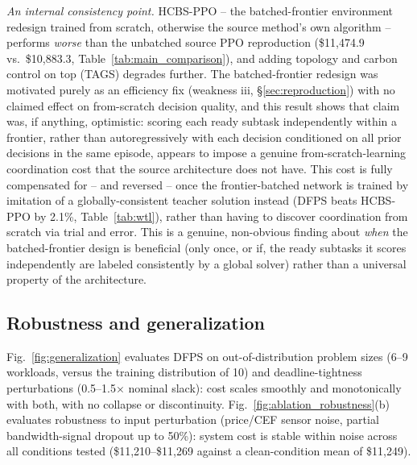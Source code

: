 \documentclass[journal]{IEEEtran}
\begin{document}
\textit{An internal consistency point.} HCBS-PPO -- the batched-frontier environment redesign trained from scratch, otherwise the source method's own algorithm -- performs \emph{worse} than the unbatched source PPO reproduction (\$11{,}474.9 vs.\ \$10{,}883.3, Table~\ref{tab:main_comparison}), and adding topology and carbon control on top (TAGS) degrades further. The batched-frontier redesign was motivated purely as an efficiency fix (weakness iii, \S\ref{sec:reproduction}) with no claimed effect on from-scratch decision quality, and this result shows that claim was, if anything, optimistic: scoring each ready subtask independently within a frontier, rather than autoregressively with each decision conditioned on all prior decisions in the same episode, appears to impose a genuine from-scratch-learning coordination cost that the source architecture does not have. This cost is fully compensated for -- and reversed -- once the frontier-batched network is trained by imitation of a globally-consistent teacher solution instead (DFPS beats HCBS-PPO by 2.1\%, Table~\ref{tab:wtl}), rather than having to discover coordination from scratch via trial and error. This is a genuine, non-obvious finding about \emph{when} the batched-frontier design is beneficial (only once, or if, the ready subtasks it scores independently are labeled consistently by a global solver) rather than a universal property of the architecture.

\subsection{Robustness and generalization}
Fig.~\ref{fig:generalization} evaluates DFPS on out-of-distribution problem sizes (6--9 workloads, versus the training distribution of 10) and deadline-tightness perturbations (0.5--1.5$\times$ nominal slack): cost scales smoothly and monotonically with both, with no collapse or discontinuity. Fig.~\ref{fig:ablation_robustness}(b) evaluates robustness to input perturbation (price/CEF sensor noise, partial bandwidth-signal dropout up to 50\%): system cost is stable within noise across all conditions tested (\$11{,}210--\$11{,}269 against a clean-condition mean of \$11{,}249).
\end{document}

